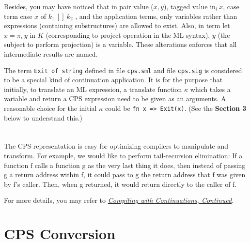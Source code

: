 \documentclass{article}
\theoremstyle{definition}
\theoremstyle{remark}
\numberwithin{equation}{section}
\begin{document}
Besides, you may have noticed that in pair value ($x,y$), tagged value
\textsf{in}$_i\ x$, case term \textsf{case} $x$ \textsf{of} $k_1\ [\!]\ k_2$
, and the application terms, only variables rather than expressions
 (containing substructures) are allowed to exist.
Also, in term \textsf{let }$x = \pi _i\ y$\textsf{ in }$K$
(corresponding to project operation in the ML syntax),
$y$ (the subject to perform projection) is a variable.
  These alterations enforces that all intermediate results are named.

The term \texttt{Exit of string} defined in file \texttt{cps.sml}
and file \texttt{cps.sig} is considered to be a special kind of continuation
  application. It is for the purpose that initially, to translate an ML expression,
 a translate function $\kappa$ which takes a variable and return a CPS
 expression need to be given as an arguments. A reasonable choice for the initial
 $\kappa$ could be \texttt{fn x => Exit(x)}. (See the \textbf{Section 3}
 below to understand this.)\\

\\\\

The CPS representation is easy for optimizing compilers to manipulate and
transform. For example, we would like to perform tail-recursion elimination: If a
function f calls a function g as the very last thing it does, then instead of passing
g a return address within f, it could pass to g the return address that f was given
by f's caller. Then, when g returned, it would return directly to the caller of f.

For more details, you may refer to \href{
http://research.microsoft.com/pubs/64044/compilingwithcontinuationscontinued.pdf}
{\emph{Compiling with Continuations, Continued}}.

\section{CPS Conversion}
\end{document}
